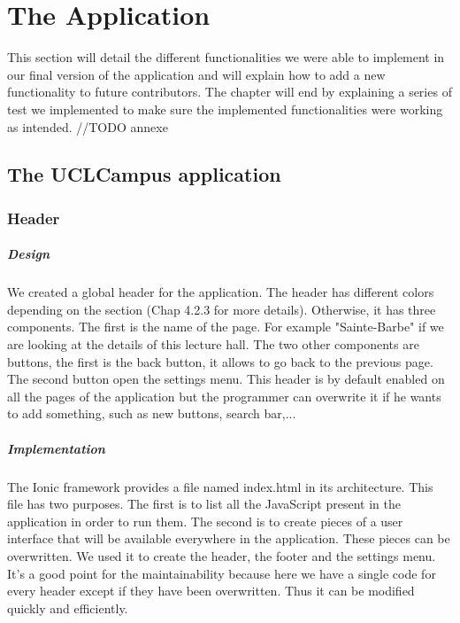 \documentclass{eplmastersthesis}
\begin{document}
\newpage

\chapter{The Application}

This section will detail the different functionalities we were able to implement in our final version of the application and will explain how to add a new functionality to future contributors. The chapter will end by explaining a series of test we implemented to make sure the implemented functionalities were working as intended. //TODO annexe

\section{The UCLCampus application}

\subsection{Header}
\paragraph{Design}
We created a global header for the application. The header has different colors depending on the section (Chap 4.2.3 for more details). Otherwise, it has three components. The first is the name of the page. For example "Sainte-Barbe" if we are looking at the details of this lecture hall. The two other components are buttons, the first is the back button, it allows to go back to the previous page. The second button open the settings menu. This header is by default enabled on all the pages of the application but the programmer can overwrite it if he wants to add something, such as new buttons, search bar,...
\paragraph{Implementation}
The Ionic framework provides a file named index.html in its architecture. This file has two purposes. The first is to list all the JavaScript present in the application in order to run them. The second is to create pieces of a user interface that will be available everywhere in the application. These pieces can be overwritten. We used it to create the header, the footer and the settings menu. It's a good point for the maintainability because here we have a single code for every header except if they have been overwritten. Thus it can be modified quickly and efficiently. 
\end{document}
